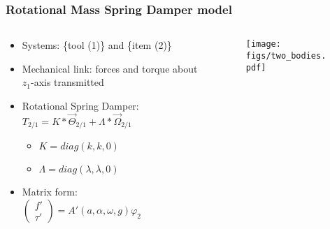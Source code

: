 \documentclass[aspectratio=1610]{beamer}
\begin{document}
\begin{frame}
\frametitle{Rotational Mass Spring Damper model}
\begin{columns}
\begin{column}{0.5\textwidth}
  \begin{itemize}\itemsep1em
    \justifying
    \item Systems: \{tool (1)\} and \{item (2)\}
    \item Mechanical link: forces and torque about $z_1$-axis transmitted
    \item Rotational Spring Damper: \\
    $T_{2/1} = K \ast \overrightarrow{\Theta}_{2/1} + \Lambda \ast \overrightarrow{\Omega}_{2/1}$
    \begin{itemize}
      \item $K = diag(k, k, 0)$
      \item $\Lambda = diag(\lambda, \lambda, 0)$
    \end{itemize}
    \item Matrix form: \\
    \vspace{0.5cm}
    $\begin{pmatrix}
      f'    \\
      \tau'
     \end{pmatrix}
     = A'(a, \alpha, \omega, g) \varphi_2$

  \end{itemize}
\end{column}
\begin{column}{0.5\textwidth}  %
  \begin{figure}
    \centering
    \texttt{[image: figs/two\_bodies.pdf]}
  \end{figure}
\end{column}
\end{columns}

\end{frame}
\end{document}
